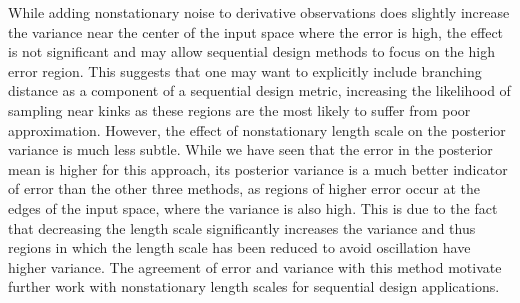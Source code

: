 \documentclass{article}
\begin{document}
While adding nonstationary noise to derivative observations does slightly increase the variance near the center of the input space where the error is high, the effect is not significant and may allow sequential design methods to focus on the high error region. This suggests that one may want to explicitly include branching distance as a component of a sequential design metric, increasing the likelihood of sampling near kinks as these regions are the most likely to suffer from poor approximation. However, the effect of nonstationary length scale on the posterior variance is much less subtle. While we have seen that the error in the posterior mean is higher for this approach, its posterior variance is a much better indicator of error than the other three methods, as regions of higher error occur at the edges of the input space, where the variance is also high. This is due to the fact that decreasing the length scale significantly increases the variance and thus regions in which the length scale has been reduced to avoid oscillation have higher variance. The agreement of error and variance with this method motivate further work with nonstationary length scales for sequential design applications.
\end{document}
